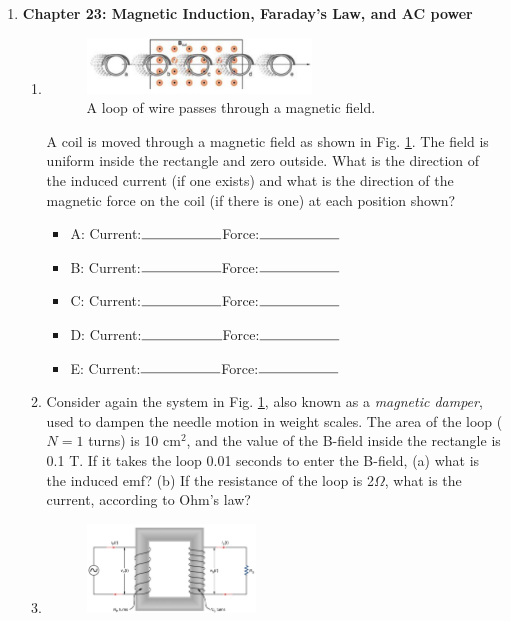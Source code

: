 \documentclass[10pt]{article}
\begin{document}
\begin{enumerate}
\item \textbf{Chapter 23: Magnetic Induction, Faraday's Law, and AC power}
\begin{enumerate}
\item
\begin{figure}[ht]
\centering
\includegraphics[width=0.6\textwidth]{movingring.png}
\caption{\label{fig:flux1} A loop of wire passes through a magnetic field.}
\end{figure}
A coil is moved through a magnetic field as shown in Fig. \ref{fig:flux1}. The field is uniform inside the rectangle and zero outside. What is the direction of the induced current (if one exists) and what is the direction of the magnetic force on the coil (if there is one) at each position shown?
\begin{itemize}
\item A: Current:$\rule{2cm}{0.15mm}$Force:$\rule{2cm}{0.15mm}$
\item B: Current:$\rule{2cm}{0.15mm}$Force:$\rule{2cm}{0.15mm}$
\item C: Current:$\rule{2cm}{0.15mm}$Force:$\rule{2cm}{0.15mm}$
\item D: Current:$\rule{2cm}{0.15mm}$Force:$\rule{2cm}{0.15mm}$
\item E: Current:$\rule{2cm}{0.15mm}$Force:$\rule{2cm}{0.15mm}$
\end{itemize}
\item Consider again the system in Fig. \ref{fig:flux1}, also known as a \textit{magnetic damper}, used to dampen the needle motion in weight scales.  The area of the loop ($N=1$ turns) is 10 cm$^2$, and the value of the B-field inside the rectangle is 0.1 T.  If it takes the loop 0.01 seconds to enter the B-field, (a) what is the induced emf? (b) If the resistance of the loop is 2$\Omega$, what is the current, according to Ohm's law? \\ \vspace{4cm}
\item 
\begin{figure}
\centering
\includegraphics[width=0.45\textwidth]{transformer.png}

\end{figure}
\end{enumerate}
\end{enumerate}
\end{document}
